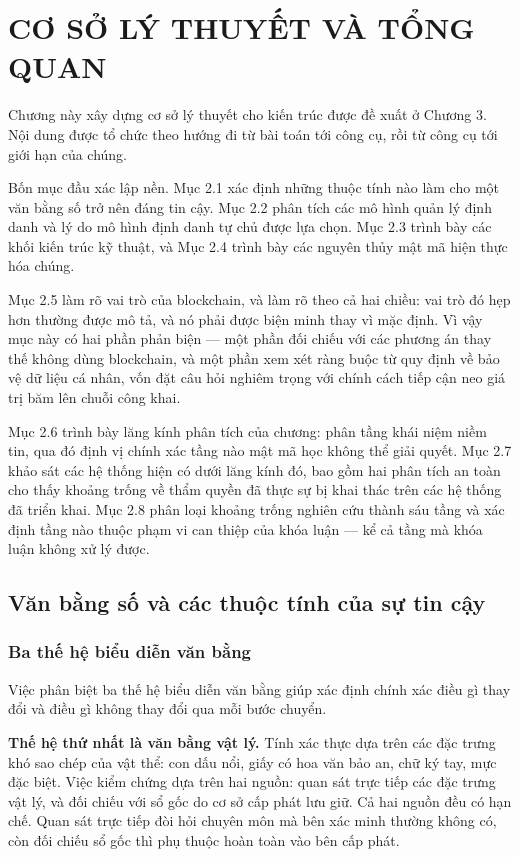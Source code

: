 \chapter{CƠ SỞ LÝ THUYẾT VÀ TỔNG QUAN}

Chương này xây dựng cơ sở lý thuyết cho kiến trúc được đề xuất ở Chương 3. Nội dung được tổ chức theo hướng đi từ bài toán tới công cụ, rồi từ công cụ tới giới hạn của chúng.

Bốn mục đầu xác lập nền. Mục 2.1 xác định những thuộc tính nào làm cho một văn bằng số trở nên đáng tin cậy. Mục 2.2 phân tích các mô hình quản lý định danh và lý do mô hình định danh tự chủ được lựa chọn. Mục 2.3 trình bày các khối kiến trúc kỹ thuật, và Mục 2.4 trình bày các nguyên thủy mật mã hiện thực hóa chúng.

Mục 2.5 làm rõ vai trò của blockchain, và làm rõ theo cả hai chiều: vai trò đó hẹp hơn thường được mô tả, và nó phải được biện minh thay vì mặc định. Vì vậy mục này có hai phần phản biện --- một phần đối chiếu với các phương án thay thế không dùng blockchain, và một phần xem xét ràng buộc từ quy định về bảo vệ dữ liệu cá nhân, vốn đặt câu hỏi nghiêm trọng với chính cách tiếp cận neo giá trị băm lên chuỗi công khai.

Mục 2.6 trình bày lăng kính phân tích của chương: phân tầng khái niệm niềm tin, qua đó định vị chính xác tầng nào mật mã học không thể giải quyết. Mục 2.7 khảo sát các hệ thống hiện có dưới lăng kính đó, bao gồm hai phân tích an toàn cho thấy khoảng trống về thẩm quyền đã thực sự bị khai thác trên các hệ thống đã triển khai. Mục 2.8 phân loại khoảng trống nghiên cứu thành sáu tầng và xác định tầng nào thuộc phạm vi can thiệp của khóa luận --- kể cả tầng mà khóa luận không xử lý được.

\section{Văn bằng số và các thuộc tính của sự tin cậy}

\subsection{Ba thế hệ biểu diễn văn bằng}

Việc phân biệt ba thế hệ biểu diễn văn bằng giúp xác định chính xác điều gì thay đổi và điều gì không thay đổi qua mỗi bước chuyển.

\textbf{Thế hệ thứ nhất là văn bằng vật lý.} Tính xác thực dựa trên các đặc trưng khó sao chép của vật thể: con dấu nổi, giấy có hoa văn bảo an, chữ ký tay, mực đặc biệt. Việc kiểm chứng dựa trên hai nguồn: quan sát trực tiếp các đặc trưng vật lý, và đối chiếu với sổ gốc do cơ sở cấp phát lưu giữ. Cả hai nguồn đều có hạn chế. Quan sát trực tiếp đòi hỏi chuyên môn mà bên xác minh thường không có, còn đối chiếu sổ gốc thì phụ thuộc hoàn toàn vào bên cấp phát.

